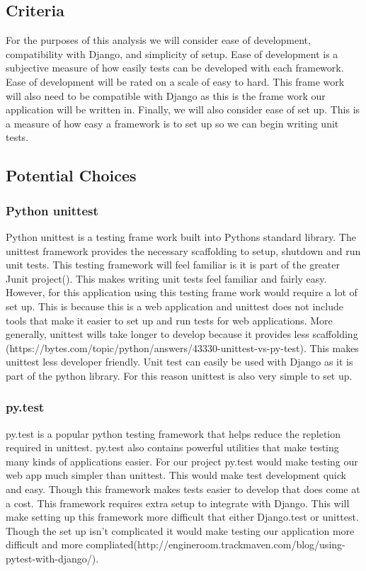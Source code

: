 \documentclass[letterpaper,10pt]{article}
\begin{document}
	\subsection{Criteria}
		For the purposes of this analysis we will consider ease of development, compatibility with Django, and simplicity of setup. Ease of development is a subjective measure of how easily tests can be developed with each framework. Ease of development will be rated on a scale of easy to hard. This frame work will also need to be compatible with Django as this is the frame work our application will be written in. Finally, we will also consider ease of set up. This is a measure of how easy a framework is to set up so we can begin writing unit tests.
	\subsection{Potential Choices}
		\subsubsection{Python unittest}
			Python unittest is a testing frame work built into Pythons standard library. The unittest framework provides the necessary scaffolding to setup, shutdown and run unit tests. This testing framework will feel familiar is it is part of the greater Junit project(). This makes writing unit tests feel familiar and fairly easy. However, for this application using this testing frame work would require a lot of set up. This is because this is a web application and unittest does not include tools that make it easier to set up and run tests for web applications. More generally, unittest wills take longer to develop because it provides less scaffolding (https://bytes.com/topic/python/answers/43330-unittest-vs-py-test). This makes unittest less developer friendly. Unit test can easily be used with Django as it is part of the python library. For this reason unittest is also very simple to set up.
		\subsubsection{py.test}
			py.test is a popular python testing framework that helps reduce the repletion required in unittest. py.test also contains powerful utilities that make testing many kinds of applications easier. For our project py.test would make testing our web app much simpler than unittest. This would make test development quick and easy. Though this framework makes tests easier to develop that does come at a cost. This framework requires extra setup to integrate with Django. This will make setting up this framework more difficult that either Django.test or unittest. Though the set up isn't complicated it would make testing our application more difficult and more compliated(http://engineroom.trackmaven.com/blog/using-pytest-with-django/).
\end{document}
